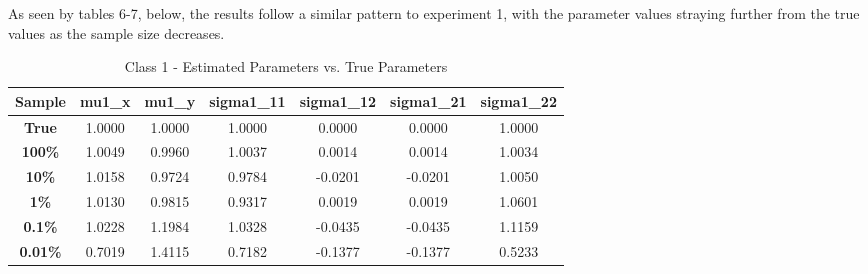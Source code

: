 \documentclass{article}
\begin{document}
\noindent As seen by tables 6-7, below, the results follow a similar pattern to experiment 1, with the parameter values straying further from the true values
as the sample size decreases. 

\begin{table}[H]
\centering
\small
\caption{Class 1 - Estimated Parameters vs. True Parameters}
\vspace{-0.4em}
\begin{tabular}{ccccccc}
\toprule
\textbf{Sample} & \textbf{mu1\_x} & \textbf{mu1\_y} & \textbf{sigma1\_11} & \textbf{sigma1\_12} & \textbf{sigma1\_21} & \textbf{sigma1\_22} \\
\midrule
\textbf{True} & \cellcolor{trueyellow} 1.0000 & \cellcolor{trueyellow} 1.0000 & \cellcolor{trueyellow} 1.0000 & \cellcolor{trueyellow} 0.0000 & \cellcolor{trueyellow} 0.0000 & \cellcolor{trueyellow} 1.0000 \\
\textbf{100\%} & \cellcolor{meangreen} 1.0049 & \cellcolor{meangreen} 0.9960 & \cellcolor{sigmablue} 1.0037 & \cellcolor{offpurple} 0.0014 & \cellcolor{offpurple} 0.0014 & \cellcolor{sigmablue} 1.0034 \\
\textbf{10\%} & \cellcolor{meangreen} 1.0158 & \cellcolor{meangreen} 0.9724 & \cellcolor{sigmablue} 0.9784 & \cellcolor{offpurple} -0.0201 & \cellcolor{offpurple} -0.0201 & \cellcolor{sigmablue} 1.0050 \\
\textbf{1\%} & \cellcolor{meangreen} 1.0130 & \cellcolor{meangreen} 0.9815 & \cellcolor{sigmablue} 0.9317 & \cellcolor{offpurple} 0.0019 & \cellcolor{offpurple} 0.0019 & \cellcolor{sigmablue} 1.0601 \\
\textbf{0.1\%} & \cellcolor{meangreen} 1.0228 & \cellcolor{meangreen} 1.1984 & \cellcolor{sigmablue} 1.0328 & \cellcolor{offpurple} -0.0435 & \cellcolor{offpurple} -0.0435 & \cellcolor{sigmablue} 1.1159 \\
\textbf{0.01\%} & \cellcolor{meangreen} 0.7019 & \cellcolor{meangreen} 1.4115 & \cellcolor{sigmablue} 0.7182 & \cellcolor{offpurple} -0.1377 & \cellcolor{offpurple} -0.1377 & \cellcolor{sigmablue} 0.5233 \\
\bottomrule
\end{tabular}
\end{table}
\end{document}
